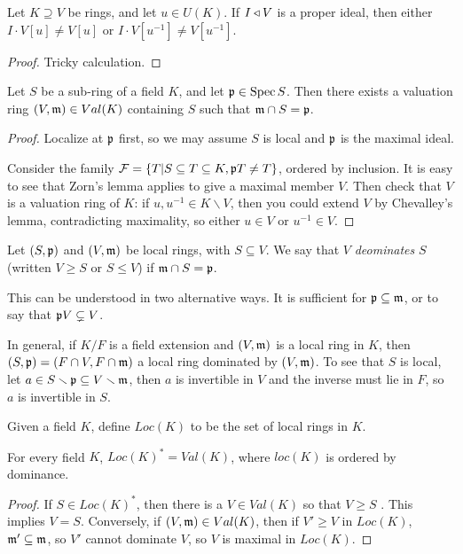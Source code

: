  \begin{lemma}[Chevalley]
   Let $K\supseteq V$ be rings, and let $u\in U(K)$. If $I\triangleleft V$ is a proper ideal, then
   either $I\cdot V[u]\neq V[u]$ or $I\cdot V[u^{-1}]\neq V[u^{-1}]$.
 \end{lemma}
 \begin{proof}
   Tricky calculation. \anton{}
 \end{proof}
 \begin{theorem}
   Let $S$ be a sub-ring of a field $K$, and let $\mathfrak{p}\in\operatorname{Spec} S$. Then there exists a
   valuation ring $(V,\mathfrak{m})\in Val(K)$ containing $S$ such that $\mathfrak{m}\cap S=\mathfrak{p}$.
 \end{theorem}
 \begin{proof}
   Localize at $\mathfrak{p}$ first, so we may assume $S$ is local and $\mathfrak{p}$ is the maximal ideal.

   Consider the family $\mathcal{F}=\{T| S\subseteq T\subseteq K, \mathfrak{p} T\neq T\}$, ordered by
   inclusion. It is easy to see that Zorn's lemma applies to give a maximal member $V$.
   Then check that $V$ is a valuation ring of $K$: if $u,u^{-1}\in K\smallsetminus V$,
   then you could extend $V$ by Chevalley's lemma, contradicting maximality, so either
   $u\in V$ or $u^{-1}\in V$.
 \end{proof}
 \begin{definition}
   Let $(S,\mathfrak{p})$ and $(V,\mathfrak{m})$ be local rings, with $S\subseteq V$. We say that $V$
   \emph{deominates} $S$ (written $V\ge S$ or $S\le V$) if $\mathfrak{m}\cap S=\mathfrak{p}$.
 \end{definition}
 This can be understood in two alternative ways. It is sufficient for $\mathfrak{p}\subseteq \mathfrak{m}$,
 or to say that $\mathfrak{p} V\subsetneq V$.

 In general, if $K/F$ is a field extension and $(V,\mathfrak{m})$ is a local ring in $K$, then
 $(S,\mathfrak{p})=(F\cap V,F\cap \mathfrak{m})$ a local ring dominated by $(V,\mathfrak{m})$. To see that $S$ is
 local, let $a\in S\smallsetminus \mathfrak{p}\subseteq V\smallsetminus \mathfrak{m}$, then $a$ is invertible
 in $V$ and the inverse must lie in $F$, so $a$ is invertible in $S$.

 Given a field $K$, define $Loc(K)$ to be the set of local rings in $K$.
 \begin{theorem}
   For every field $K$, $Loc(K)^*=Val(K)$, where $loc(K)$ is ordered by dominance.
 \end{theorem}
 \begin{proof}
   If $S\in Loc(K)^*$, then there is a $V\in Val(K)$ so that $V\ge S$ \anton{}. This
   implies $V=S$. Conversely, if $(V,\mathfrak{m})\in Val(K)$, then if $V'\ge V$ in $Loc(K)$,
   $\mathfrak{m}'\subseteq \mathfrak{m}$, so $V'$ cannot dominate $V$, so $V$ is maximal in $Loc(K)$.
 \end{proof}
